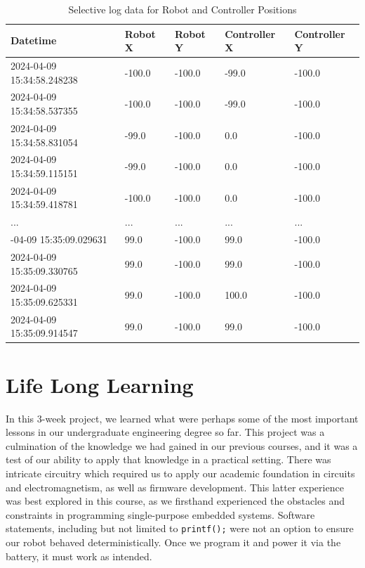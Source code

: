 \documentclass{article}
\begin{document}
\begin{table}[ht]
    \centering
    \begin{tabular}{@{}lllll@{}}
    \toprule
    \textbf{Datetime}                & \textbf{Robot X} & \textbf{Robot Y} & \textbf{Controller X} & \textbf{Controller Y} \\ \midrule
    2024-04-09 15:34:58.248238 & -100.0         & -100.0         & -99.0             & -100.0            \\
    2024-04-09 15:34:58.537355 & -100.0         & -100.0         & -99.0             & -100.0            \\
    2024-04-09 15:34:58.831054 & -99.0          & -100.0         & 0.0               & -100.0            \\
    2024-04-09 15:34:59.115151 & -99.0          & -100.0         & 0.0               & -100.0            \\
    2024-04-09 15:34:59.418781 & -100.0         & -100.0         & 0.0               & -100.0            \\ \addlinespace
    ...                            & ...            & ...            & ...               & ...               \\ \addlinespace
    2024-04-09 15:35:09.029631 & 99.0           & -100.0         & 99.0              & -100.0            \\
    2024-04-09 15:35:09.330765 & 99.0           & -100.0         & 99.0              & -100.0            \\
    2024-04-09 15:35:09.625331 & 99.0           & -100.0         & 100.0             & -100.0            \\
    2024-04-09 15:35:09.914547 & 99.0           & -100.0         & 99.0              & -100.0            \\ \bottomrule
    \end{tabular}
    \caption{Selective log data for Robot and Controller Positions}
    \label{table:data_log}
\end{table}



\section{Life Long Learning}

In this 3-week project, we learned what were perhaps some of the most important lessons in our undergraduate engineering degree so far. This project was a
culmination of the knowledge we had gained in our previous courses, and it was a test of our ability to apply that knowledge in a practical setting. There was
intricate circuitry which required us to apply our academic foundation in circuits and electromagnetism, as well as firmware development. This latter experience was
best explored in this course, as we firsthand experienced the obstacles and constraints in programming single-purpose embedded systems. Software statements, including but not limited to
\texttt{printf();} were not an option to ensure our robot behaved deterministically. Once we program it and power it via the battery, it must work as intended.
\end{document}
